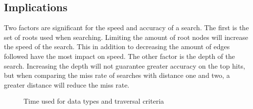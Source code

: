 \subsection{Implications}
Two factors are significant for the speed and accuracy of a search. The first is the set of roots used when searching. Limiting the amount of root nodes will increase the speed of the search. This in addition to decreasing the amount of edges followed have the most impact on speed. The other factor is the depth of the search. Increasing the depth will not guarantee greater accuracy on the top hits, but when comparing the miss rate of searches with distance one and two, a greater distance will reduce the miss rate.

\begin{figure}
	\caption{Time used for data types and traversal criteria}
	\label{fig:barTime}
	
\end{figure}

\glsresetall
